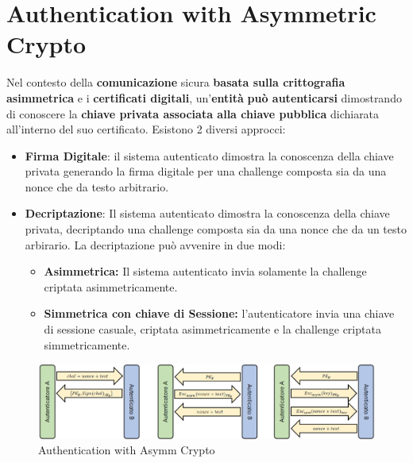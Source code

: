 \section{Authentication with Asymmetric Crypto}
Nel contesto della \textbf{comunicazione} sicura \textbf{basata sulla crittografia asimmetrica} e i \textbf{certificati digitali}, un’\textbf{entità} \textbf{può autenticarsi} dimostrando di conoscere la \textbf{chiave privata associata alla chiave pubblica} dichiarata all'interno del suo certificato. Esistono 2 diversi approcci:
\begin{itemize}
    \item \textbf{Firma Digitale}: il sistema autenticato dimostra la conoscenza della chiave privata generando la firma digitale per una challenge composta sia da una nonce che da testo arbitrario.
    \item \textbf{Decriptazione}: Il sistema autenticato dimostra la conoscenza della chiave privata, decriptando una challenge composta sia da una nonce che da un testo arbirario. La decriptazione può avvenire in due modi:
    \begin{itemize}
        \item \textbf{Asimmetrica:} Il sistema autenticato invia solamente la challenge criptata asimmetricamente.
        \item \textbf{Simmetrica con chiave di Sessione:} l'autenticatore invia una chiave di sessione casuale, criptata asimmetricamente e la challenge criptata simmetricamente.
    \end{itemize}
\end{itemize}
\begin{figure}[h]
    \centering
    \includegraphics{image/authasymm.png}
    \caption{Authentication with Asymm Crypto}
    \label{fig:authasymm}
\end{figure}